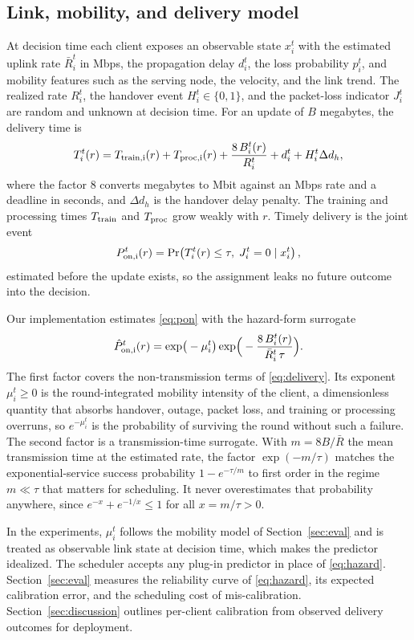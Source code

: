 \documentclass[preprint,12pt]{elsarticle}
\begin{document}
\subsection{Link, mobility, and delivery model}
At decision time each client exposes an observable state $x_i^t$ with the estimated uplink rate $\bar R_i^t$ in Mbps, the propagation delay $d_i^t$, the loss probability $p_i^t$, and mobility features such as the serving node, the velocity, and the link trend. The realized rate $R_i^t$, the handover event $H_i^t\in\{0,1\}$, and the packet-loss indicator $J_i^t$ are random and unknown at decision time. For an update of $B$ megabytes, the delivery time is
\begin{equation}
T_i^t(r)=T_{\rm train,i}(r)+T_{\rm proc,i}(r)+\frac{8\,B_i^t(r)}{R_i^t}+d_i^t+H_i^t\Delta d_h,
\label{eq:delivery}
\end{equation}
where the factor 8 converts megabytes to Mbit against an Mbps rate and a deadline in seconds, and $\Delta d_h$ is the handover delay penalty. The training and processing times $T_{\rm train}$ and $T_{\rm proc}$ grow weakly with $r$. Timely delivery is the joint event
\begin{equation}
P_{\rm on,i}^t(r)=\Pr\!\left(T_i^t(r)\le\tau,\;J_i^t=0\mid x_i^t\right),
\label{eq:pon}
\end{equation}
estimated before the update exists, so the assignment leaks no future outcome into the decision.

Our implementation estimates \eqref{eq:pon} with the hazard-form surrogate
\begin{equation}
\hat P_{\rm on,i}^t(r)=\exp\!\big(-\mu_i^t\big)\exp\!\Big(-\frac{8\,B_i^t(r)}{\bar R_i^t\,\tau}\Big).
\label{eq:hazard}
\end{equation}
The first factor covers the non-transmission terms of \eqref{eq:delivery}. Its exponent $\mu_i^t\ge 0$ is the round-integrated mobility intensity of the client, a dimensionless quantity that absorbs handover, outage, packet loss, and training or processing overruns, so $e^{-\mu_i^t}$ is the probability of surviving the round without such a failure. The second factor is a transmission-time surrogate. With $m=8B/\bar R$ the mean transmission time at the estimated rate, the factor $\exp(-m/\tau)$ matches the exponential-service success probability $1-e^{-\tau/m}$ to first order in the regime $m\ll\tau$ that matters for scheduling. It never overestimates that probability anywhere, since $e^{-x}+e^{-1/x}\le 1$ for all $x=m/\tau>0$.

In the experiments, $\mu_i^t$ follows the mobility model of Section~\ref{sec:eval} and is treated as observable link state at decision time, which makes the predictor idealized. The scheduler accepts any plug-in predictor in place of \eqref{eq:hazard}. Section~\ref{sec:eval} measures the reliability curve of \eqref{eq:hazard}, its expected calibration error, and the scheduling cost of mis-calibration. Section~\ref{sec:discussion} outlines per-client calibration from observed delivery outcomes for deployment.
\end{document}

